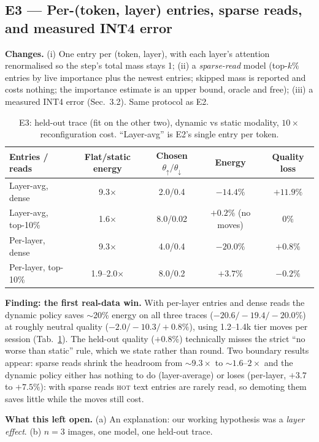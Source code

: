\documentclass[10pt,a4paper]{article}
\newcommand{\hot}{\textsc{hot}}
\begin{document}
\subsection{E3 --- Per-(token, layer) entries, sparse reads, and measured INT4 error}
\label{sec:layers}
\textbf{Changes.} (i) One entry per (token, layer), with each layer's attention renormalised so the step's total mass stays 1; (ii) a \emph{sparse-read} model (top-$k\%$ entries by live importance plus the newest entries; skipped mass is reported and costs nothing; the importance estimate is an upper bound, oracle and free); (iii) a measured INT4 error (Sec.~3.2). Same protocol as E2.

\begin{table}[t]
\centering\small
\caption{E3: held-out trace (fit on the other two), dynamic vs static modality, $10\times$ reconfiguration cost. ``Layer-avg'' is E2's single entry per token.}
\label{tab:e3}
\begin{tabular}{lcccc}
\toprule
Entries / reads & Flat/static energy & Chosen $\theta_\uparrow/\theta_\downarrow$ & Energy & Quality loss\\
\midrule
Layer-avg, dense        & 9.3$\times$ & 2.0/0.4 & $-14.4\%$ & $+11.9\%$\\
Layer-avg, top-10\%     & 1.6$\times$ & 8.0/0.02 & $+0.2\%$ (no moves) & $0\%$\\
Per-layer, dense        & 9.3$\times$ & 4.0/0.4 & $\mathbf{-20.0\%}$ & $+0.8\%$\\
Per-layer, top-10\%     & 1.9--2.0$\times$ & 8.0/0.2 & $+3.7\%$ & $-0.2\%$\\
\bottomrule
\end{tabular}
\end{table}

\textbf{Finding: the first real-data win.} With per-layer entries and dense reads the dynamic policy saves $\sim$20\% energy on all three traces ($-20.6/-19.4/-20.0\%$) at roughly neutral quality ($-2.0/-10.3/+0.8\%$), using 1.2--1.4k tier moves per session (Tab.~\ref{tab:e3}). The held-out quality ($+0.8\%$) technically misses the strict ``no worse than static'' rule, which we state rather than round. Two boundary results appear: sparse reads shrink the headroom from $\sim\!9.3\times$ to $\sim\!1.6$--$2\times$ and the dynamic policy either has nothing to do (layer-average) or loses (per-layer, $+3.7$ to $+7.5\%$): with sparse reads \hot{} text entries are rarely read, so demoting them saves little while the moves still cost.

\textbf{What this left open.} (a) An explanation: our working hypothesis was a \emph{layer effect}. (b) $n=3$ images, one model, one held-out trace.
\end{document}
